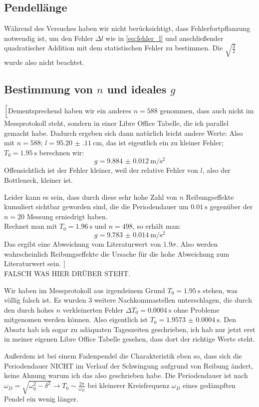 \subsection{Pendellänge}
Während des Versuches haben wir nicht berücksichtigt, dass Fehlerfortpflanzung notwendig ist, um den Fehler \(\Delta l\) wie in \cref{eq:fehler_l} und anschließender quadratischer Addition mit dem statistischen Fehler zu bestimmen. 
Die \(\sqrt{\frac{3}{2}}\) wurde also nicht beachtet.

\subsection{Bestimmung von \(n\) und ideales \(g\)}
\(\Bigl[\)Dementsprechend haben wir ein anderes \(n=588\) genommen, dass auch nicht im Messprotokoll steht, sondern in einer Libre Office Tabelle, die ich parallel gemacht habe. Dadurch ergeben sich dann natürlich leicht andere Werte: Also mit \(n=588\); \(l=\qty{95.20(11)}{\cm}\), das ist eigentlich ein zu kleiner Fehler; \(T_0=\qty{1.95}{\s}\) berechnen wir:
\[g=\qty{9.884(12)}{\m\per\s\squared}\]
Offensichtlich ist der Fehler kleiner, weil der relative Fehler von \(l\), also der Bottleneck, kleiner ist.

Leider kann es sein, dass durch diese sehr hohe Zahl von \(n\) Reibungseffekte kumuliert sichtbar geworden sind, die die Periodendauer um \(\qty{0.01}{\s}\) gegenüber der \(n=20\) Messung erniedrigt haben.\\
Rechnet man mit \(T_0=\qty{1.96}{\s}\) und \(n=498\), so erhält man:
\[g=\qty{9.783(14)}{\m\per\s\squared}\]
Das ergibt eine Abweichung vom Literaturwert von \(1.9\sigma\). Also werden wahrscheinlich Reibungseffekte die Ursache für die hohe Abweichung zum Literaturwert sein. \(\Bigr]\)\\
FALSCH WAS HIER DRÜBER STEHT.

Wir haben im Messprotokoll aus irgendeinem Grund \(T_0=\qty{1.95}{\s}\) stehen, was völlig falsch ist. Es wurden 3 weitere Nachkommastellen unterschlagen, die durch den durch hohes \(n\) verkleinerten Fehler \(\Delta T_0=\qty{0.0004}{\s}\) ohne Probleme mitgenomen werden können. Also eigentlich ist \(T_0=\qty{1.9573(4)}{\s}\). Den Absatz hab ich sogar zu adäquaten Tageszeiten geschrieben, ich hab nur jetzt erst in meiner eigenen Libre Office Tabelle gesehen, dass dort der richtige Werte steht.

Außerdem ist bei einem Fadenpendel die Charakteristik eben so, dass sich die Periodendauer NICHT im Verlauf der Schwingung aufgrund von Reibung ändert, keine Ahnung warum ich das also geschrieben habe. Die Periodendauer ist nach \(\omega_D=\sqrt{\omega_0^2-\delta^2}\rightarrow T_0\sim\frac{2\pi}{\omega_D}\) bei kleinerer Kreisfrequenz \(\omega_D\) eines gedämpften Pendel ein wenig länger.

